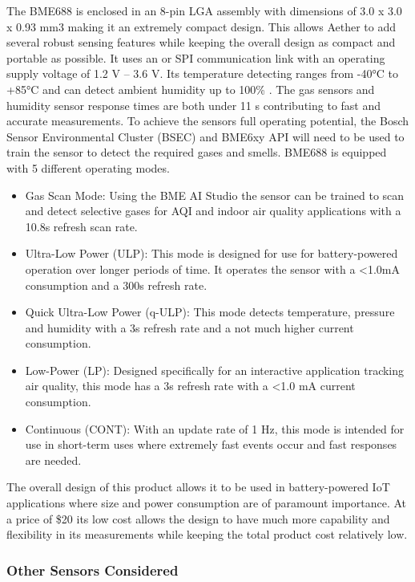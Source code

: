 The BME688 is enclosed in an 8-pin LGA assembly with dimensions of 3.0 x 3.0 x 0.93 mm3 making it an extremely compact design. This allows Aether to add several robust sensing features while keeping the overall design as compact and portable as possible. It uses an \iic or SPI communication link with an operating supply voltage of 1.2 V – 3.6 V. Its temperature detecting ranges from -40°C to +85°C and can detect ambient humidity up to 100\% . The gas sensors and humidity sensor response times are both under 11 s contributing to fast and accurate measurements. To achieve the sensors full operating potential, the Bosch Sensor Environmental Cluster (BSEC) and BME6xy API will need to be used to train the sensor to detect the required gases and smells. BME688 is equipped with 5 different operating modes.

\begin {itemize}
\item Gas Scan Mode: Using the BME AI Studio the sensor can be trained to scan and detect selective gases for AQI and indoor air quality applications with a 10.8s refresh scan rate.
\item Ultra-Low Power (ULP):  This mode is designed for use for battery-powered operation over longer periods of time. It operates the sensor with a <1.0mA consumption and a 300s refresh rate.
\item Quick Ultra-Low Power (q-ULP): This mode detects temperature, pressure and humidity with a 3s refresh rate and a not much higher current consumption.
\item Low-Power (LP): Designed specifically for an interactive application tracking air quality, this mode has a 3s refresh rate with a <1.0 mA current consumption. 
\item Continuous (CONT): With an update rate of 1 Hz, this mode is intended for use in short-term uses where extremely fast events occur and fast responses are needed. 

\end {itemize}
The overall design of this product allows it to be used in battery-powered IoT applications where size and power consumption are of paramount importance. At a price of \$20 its low cost allows the design to have much more capability and flexibility in its measurements while keeping the total product cost relatively low.

\subsubsection{Other Sensors Considered}

